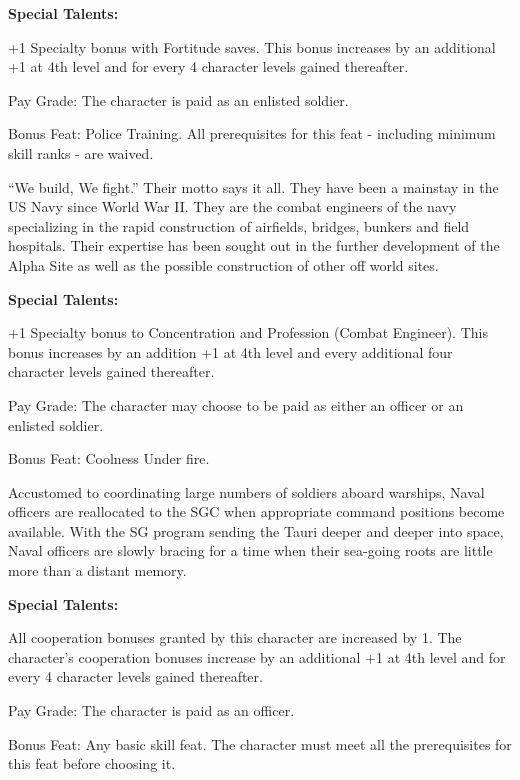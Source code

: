 \textbf{Special Talents:}
\begin{itemize*}
\item +1 Specialty bonus with Fortitude saves. This bonus increases by an additional +1 at 4th level and for every 4 character levels gained thereafter.
\item Pay Grade: The character is paid as an enlisted soldier.
\item Bonus Feat: Police Training. All prerequisites for this feat - including minimum skill ranks - are waived.
\end{itemize*}

“We build, We fight.”  Their motto says it all. They have been a mainstay in the US Navy since World War II. They are the combat engineers of the navy specializing in the rapid construction of airfields, bridges, bunkers and field hospitals. Their expertise has been sought out in the further development of the Alpha Site as well as the possible construction of other off world sites.

\textbf{Special Talents:}
\begin{itemize*}
\item +1 Specialty bonus to Concentration and Profession (Combat Engineer).  This bonus increases by an addition +1 at 4th level and every additional four character levels gained thereafter.
\item Pay Grade: The character may choose to be paid as either an officer or an enlisted soldier.
\item Bonus Feat: Coolness Under fire.
\end{itemize*}

Accustomed to coordinating large numbers of soldiers aboard warships, Naval officers are reallocated to the SGC when appropriate command positions become available. With the SG program sending the Tauri deeper and deeper into space, Naval officers are slowly bracing for a time when their sea-going roots are little more than a distant memory.

\textbf{Special Talents:}
\begin{itemize*}
\item All cooperation bonuses granted by this character are increased by 1. The character's cooperation bonuses increase by an additional +1 at 4th level and for every 4 character levels gained thereafter.
\item Pay Grade: The character is paid as an officer.
\item Bonus Feat: Any basic skill feat. The character must meet all the prerequisites for this feat before choosing it.
\end{itemize*}


